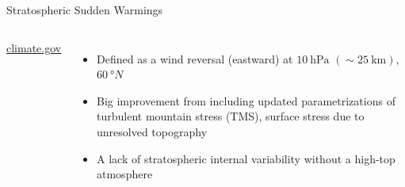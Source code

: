 \documentclass[xcolor=dvipsnames]{beamer} %
\begin{document}
\begin{frame}{Stratospheric Sudden Warmings}
	\begin{columns}
		\centering
		{\tiny\href{https://www.climate.gov/news-features/blogs/enso/polar-vortex-going-make-you-put-sweater-be-afraid-be-very-afraid\#:~:text=Thus\%2C\%20the\%20tropospheric\%20polar\%20vortex,that\%20separates\%20the\%20air\%20masses.}{climate.gov}}
		\begin{itemize}
			\item Defined as a wind reversal (eastward) at $ \SI{10}{\hecto\pascal} $ $ (\sim\SI{25}{\kilo\metre}) $, $ \SI{60}{\degree N} $
			\item Big improvement from including updated parametrizations of turbulent
			      mountain stress (TMS), surface stress due to unresolved topography %
			\item A lack of stratospheric internal variability without a high-top atmosphere %
		\end{itemize}
	\end{columns}
\end{frame}
\end{document}
